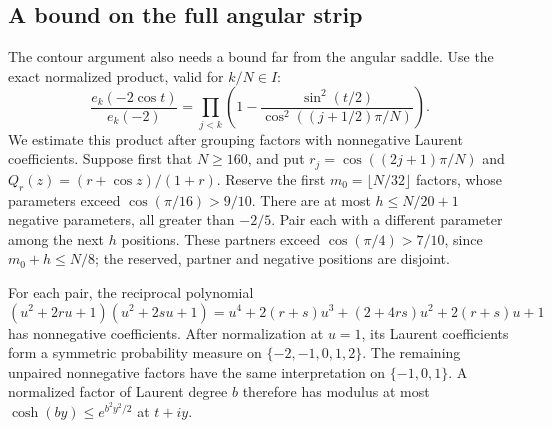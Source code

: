 \subsection{A bound on the full angular strip}\label{sec:qe-6}

The contour argument also needs a bound far from the angular saddle.
Use the exact normalized product, valid for \(k/N\in I\):
\begin{equation}
\frac{e_k(-2\cos t)}{e_k(-2)}
 =\prod_{j<k}\left(1-
          \frac{\sin^2(t/2)}{\cos^2((j+1/2)\pi/N)}\right).
\label{eq:qe-17}
\end{equation}
We estimate this product after grouping factors with nonnegative
Laurent coefficients. Suppose first that $N\ge160$, and put
$r_j=\cos((2j+1)\pi/N)$ and
$Q_r(z)=(r+\cos z)/(1+r)$. Reserve the first
$m_0=\lfloor N/32\rfloor$ factors, whose parameters exceed
$\cos(\pi/16)>9/10$. There are at most $h\le N/20+1$
negative parameters, all greater than $-2/5$. Pair each with a
different parameter among the next $h$ positions. These partners
exceed $\cos(\pi/4)>7/10$, since $m_0+h\le N/8$; the reserved,
partner and negative positions are disjoint.

For each pair, the reciprocal polynomial
\[
 (u^2+2ru+1)(u^2+2su+1)
 =u^4+2(r+s)u^3+(2+4rs)u^2+2(r+s)u+1
\]
has nonnegative coefficients. After normalization at $u=1$, its
Laurent coefficients form a symmetric probability measure on
$\{-2,-1,0,1,2\}$. The remaining unpaired nonnegative factors
have the same interpretation on $\{-1,0,1\}$. A normalized
factor of Laurent degree $b$ therefore has modulus at most
$\cosh(by)\le e^{b^2y^2/2}$ at $t+iy$.

